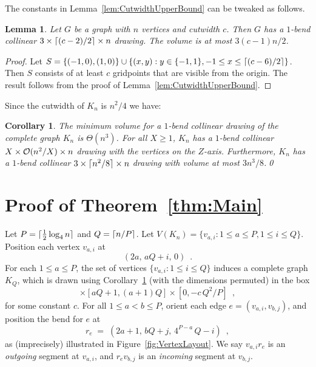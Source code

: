 \documentclass[a4paper]{article}
\newcommand{\Oh}[1]{\ensuremath{\protect\mathcal{O}(#1)}}
\newcommand{\ceil}[1]{\ensuremath{\protect\lceil#1\rceil}}
\newcommand{\half}{\ensuremath{\protect\tfrac{1}{2}}}
\newcommand{\mySection}[2]{\section{#1}\seclabel{#2}}
\newcommand{\seclabel}[1]{\label{sec:#1}}
\newcommand{\lemlabel}[1]{\label{lem:#1}}
\newcommand{\corlabel}[1]{\label{cor:#1}}
\newcommand{\lemref}[1]{Lemma~\ref{lem:#1}}
\newcommand{\thmref}[1]{Theorem~\ref{thm:#1}}
\newcommand{\figref}[1]{Figure~\ref{fig:#1}}
\newcommand{\corref}[1]{Corollary~\ref{cor:#1}}
\theoremstyle{plain}
\newtheorem{lemma}{Lemma}
\newtheorem{corollary}{Corollary}
\begin{document}
The constants in  \lemref{CutwidthUpperBound} can be tweaked as follows.

\begin{lemma}
\lemlabel{CutwidthUpperBoundSmall} 
Let $G$ be a graph with $n$ vertices and cutwidth $c$. Then $G$ has a $1$-bend collinear  $3\times\ceil{(c-2)/2}\times n$ drawing. The volume is at most $3(c-1)n/2$.
\end{lemma}

\begin{proof} 
Let $S=\{(-1,0),(1,0)\}\cup\{(x,y):y\in\{-1,1\},-1\leq x\leq
\ceil{(c-6)/2}\}$. Then $S$ consists of at least $c$ gridpoints that  are
visible from the origin.  The result follows from the proof of
\lemref{CutwidthUpperBound}. 
\end{proof}

Since the cutwidth of $K_n$ is $n^2/4$ we have:

\begin{corollary}
\corlabel{CollinearCompleteGraph} 
The minimum volume for a $1$-bend collinear drawing of the complete graph $K_n$  is $\Theta(n^3)$. For all $X\geq1$, $K_n$  has a $1$-bend collinear  $X\times\Oh{n^2/X}\times n$ drawing with the vertices on the $Z$-axis. Furthermore, $K_n$ has a $1$-bend collinear   $3\times\ceil{n^2/8}\times n$ drawing with volume at most $3n^3/8$.\qed
\end{corollary}

\mySection{Proof of \thmref{Main}}{Main}

Let $P=\ceil{\half\log_4n}$ and $Q=\ceil{n/P}$. Let $V(K_n)= \{ v_{a,i} : 1\leq
a\leq P, 1\leq i\leq Q\}$. Position each vertex $v_{a,i}$ at 
\begin{equation*}
(2a,\,aQ+i,\,0)\enspace.
\end{equation*}
For each $1\leq a\leq P$, the set of vertices $\{v_{a,i}:1\leq i\leq Q\}$
induces a complete graph $K_Q$, which is drawn 
using \corref{CollinearCompleteGraph} (with the dimensions permuted) 
in  the box
\begin{equation*}
[2a,2a+P]\times[aQ+1,(a+1)Q]\times[0,-c\,Q^2/P]\enspace,
\end{equation*}
for some constant $c$. For all $1\leq a<b\leq P$,  orient each edge
$e=(v_{a,i},v_{b,j})$,  and position the bend for $e$ at 
\begin{equation*}
r_e\;=\;(2a+1,\,bQ+j,\,4^{P-a}\, Q-i)\enspace,
\end{equation*}
as (imprecisely) illustrated in \figref{VertexLayout}. We say $v_{a,i}r_e$ is an
\emph{outgoing} segment at $v_{a,i}$, and $r_ev_{b,j}$ is an \emph{incoming}
segment at $v_{b,j}$.
\end{document}
